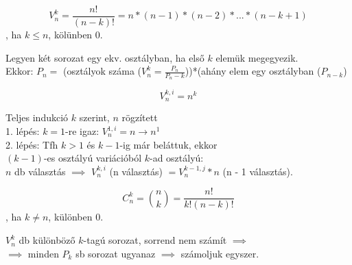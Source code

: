 \documentclass{beamer}
\begin{document}
\begin{frame}

\begin{tcolorbox}[title={Tétel: Variációk száma}]
$$V_n^k = \frac{n!}{(n - k)!} = n * (n - 1) * (n - 2) * ... * (n - k + 1)$$, ha $k \leq n$, kölünben 0.

\end{tcolorbox}

\begin{tcolorbox}[title={Bizonyítás}]
Legyen két sorozat egy ekv. osztályban, ha első $k$ elemük megegyezik.\\
Ekkor: $P_n = $ (osztályok száma ($V_n^k = \frac{P_n}{P_n - k}$))*(ahány elem egy osztályban ($P_{n - k}$)


\end{tcolorbox}

\end{frame}

\begin{frame}

\begin{tcolorbox}[title={Tétel: Ismétléses variációk száma}]
$$V_n^{k, i} = n^k$$

\end{tcolorbox}

\begin{tcolorbox}[title={Bizonyítás}]
Teljes indukció $k$ szerint, $n$ rögzített\\
1. lépés: $k = 1$-re igaz: $V_n^{1, i} = n \rightarrow n^1$\\
2. lépés: Tfh $k > 1$ és $k - 1$-ig már beláttuk, ekkor\\
$(k - 1)$-es osztályú variációból $k$-ad osztályú:\\
$n$ db választás $\implies$ $V_n^{k, i}$ (n választás) $= V_n^{k - 1, j} * n$ (n - 1 választás).

\end{tcolorbox}

\end{frame}

\begin{frame}

\begin{tcolorbox}[title={Tétel: Kombinációk száma}]
$$C_n^k = {{n}\choose{k}} = \frac{n!}{k!(n - k)!} $$, ha $k \neq n$, különben 0.

\end{tcolorbox}

\begin{tcolorbox}[title={Bizonyítás}]
$V_n^k$ db különböző $k$-tagú sorozat, sorrend nem számít $\implies$\\
$\implies$ minden $P_k$ sb sorozat ugyanaz $\implies$ számoljuk egyszer.\\

\end{tcolorbox}

\end{frame}
\end{document}
